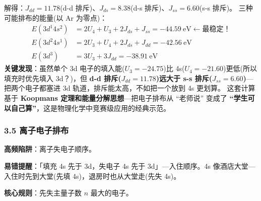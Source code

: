 \documentclass[a4paper,11pt]{ctexart}
\newcommand{\箭}{\ensuremath{\rightarrow}}
\newcommand{\左箭}{\ensuremath{\leftarrow}}
\newcommand{\上箭}{\ensuremath{\uparrow}}
\newcommand{\下箭}{\ensuremath{\downarrow}}
\newcommand{\衡}{\ensuremath{\rightleftharpoons}}
\newcommand{\双箭}{\ensuremath{\leftrightarrow}}
\newcommand{\约等于}{\ensuremath{\approx}}
\newcommand{\小于等于}{\ensuremath{\leq}}
\newcommand{\大于等于}{\ensuremath{\geq}}
\newcommand{\不等于}{\ensuremath{\neq}}
\newcommand{\西格马}{\ensuremath{\sigma}}
\newcommand{\派}{\ensuremath{\pi}}
\begin{document}
解得：\(J_{dd} = 11.78\)(d-d 排斥)、\(J_{ds} = 8.38\)(d-s 排斥)、\(J_{ss} = 6.60\)(s-s 排斥)。
三种可能排布的能量(以 Ar 为零点)：
\[\begin{aligned}
E(3d^1 4s^2) &= 2U_4 + U_3 + 2J_{ds} + J_{ss} = -44.59\ \mathrm{eV} \leftarrow \text{最稳定！}\\
E(3d^2 4s^1) &= 2U_3 + U_4 + 2J_{ds} + J_{dd} = -42.56\ \mathrm{eV}\\
E(3d^3)      &= 3U_3 + 3J_{dd} = -38.91\ \mathrm{eV}
\end{aligned}\]
\textbf{关键发现}：虽然单个 3d 电子的填入能(\(U_3 = -24.75\))比 4s(\(U_4 = -21.60\))更低(所以填充时优先填入 3d？)，但 \textbf{d-d 排斥(\(J_{dd} = 11.78\))远大于 s-s 排斥(\(J_{ss} = 6.60\))}---把两个电子都塞进 3d 轨道，排斥能太高，不如把一个放到 4s 更划算。
这套计算基于 \textbf{Koopmans 定理和能量分解思想}---把电子排布从 ``老师说'' 变成了 \textbf{``学生可以自己算''}，这是物理化学中竞赛级应用的经典示范。

\subsubsection{3.5 离子电子排布}\label{ux79bbux5b50ux7535ux5b50ux6392ux5e03}

\textbf{高频陷阱}：离子失电子顺序。

\textbf{易错提醒}：「填充 4s 先于 3d，失电子 4s 先于 3d」---入住顺序。4s 像酒店大堂---入住时先到大堂(先填 4s)，退房时也从大堂走(先失 4s)。

\textbf{核心规则}：先失主量子数 \(n\) 最大的电子。
\end{document}
